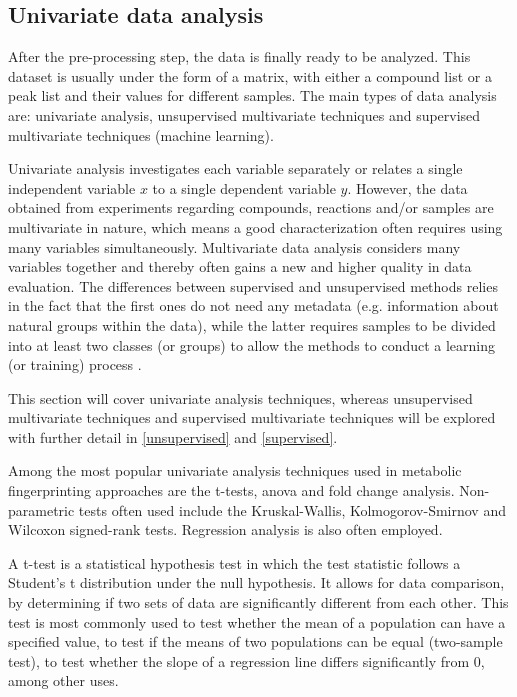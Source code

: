 
\subsection{Univariate data analysis} \label{univariate}

After the pre-processing step, the data is finally ready to be analyzed. This dataset is usually under the form of a matrix, with either a compound list or a peak list and their values for different samples. The main types of data analysis are: univariate analysis, unsupervised multivariate techniques and supervised multivariate techniques (machine learning).

Univariate analysis investigates each variable separately or relates a single independent variable $ x $ to a single dependent variable $ y $. However, the data obtained from experiments regarding compounds, reactions and/or samples are multivariate in nature, which means a good characterization often requires using many variables simultaneously. Multivariate data analysis considers many variables together and thereby often gains a new and higher quality in data evaluation. The differences between supervised and unsupervised methods relies in the fact that the first ones do not need any metadata (e.g. information about natural groups within the data), while the latter requires samples to be divided into at least two classes (or groups) to allow the methods to conduct a learning (or training) process \citep{varmuza2009introduction}.

This section will cover univariate analysis techniques, whereas unsupervised multivariate techniques and supervised multivariate techniques will be explored with further detail in \autoref{unsupervised} and \autoref{supervised}. 

Among the most popular univariate analysis techniques used in metabolic fingerprinting approaches are the t-tests, \acrfull{anova} and fold change analysis. Non-parametric tests often used include the Kruskal-Wallis, Kolmogorov-Smirnov and Wilcoxon signed-rank tests. Regression analysis is also often employed. 

A t-test is a statistical hypothesis test in which the test statistic follows a Student's t distribution under the null hypothesis. It allows for data comparison, by determining if two sets of data are significantly different from each other. This test is most commonly used to test whether the mean of a population can have a specified value, to test if the means of two populations can be equal (two-sample test), to test whether the slope of a regression line differs significantly from 0, among other uses.

